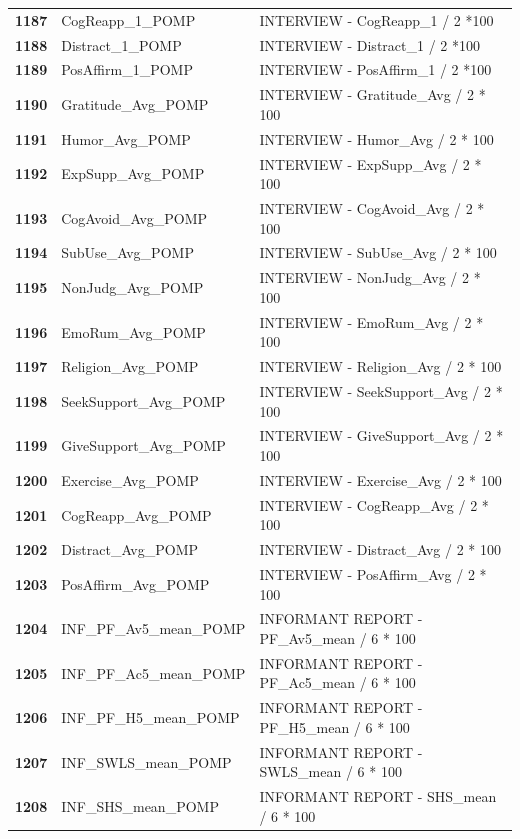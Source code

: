 \documentclass[
  letterpaper,
  DIV=11,
  numbers=noendperiod]{scrartcl}
\begin{document}
\begin{longtable}[t]{>{}cll}
\textbf{1187} & CogReapp\_1\_POMP & INTERVIEW - CogReapp\_1 / 2 *100\\
\textbf{1188} & Distract\_1\_POMP & INTERVIEW - Distract\_1 / 2 *100\\
\textbf{1189} & PosAffirm\_1\_POMP & INTERVIEW - PosAffirm\_1 / 2 *100\\
\textbf{1190} & Gratitude\_Avg\_POMP & INTERVIEW - Gratitude\_Avg / 2 * 100\\
\addlinespace
\textbf{1191} & Humor\_Avg\_POMP & INTERVIEW - Humor\_Avg / 2 * 100\\
\textbf{1192} & ExpSupp\_Avg\_POMP & INTERVIEW - ExpSupp\_Avg / 2 * 100\\
\textbf{1193} & CogAvoid\_Avg\_POMP & INTERVIEW - CogAvoid\_Avg / 2 * 100\\
\textbf{1194} & SubUse\_Avg\_POMP & INTERVIEW - SubUse\_Avg / 2 * 100\\
\textbf{1195} & NonJudg\_Avg\_POMP & INTERVIEW - NonJudg\_Avg / 2 * 100\\
\addlinespace
\textbf{1196} & EmoRum\_Avg\_POMP & INTERVIEW - EmoRum\_Avg / 2 * 100\\
\textbf{1197} & Religion\_Avg\_POMP & INTERVIEW - Religion\_Avg / 2 * 100\\
\textbf{1198} & SeekSupport\_Avg\_POMP & INTERVIEW - SeekSupport\_Avg / 2 * 100\\
\textbf{1199} & GiveSupport\_Avg\_POMP & INTERVIEW - GiveSupport\_Avg / 2 * 100\\
\textbf{1200} & Exercise\_Avg\_POMP & INTERVIEW - Exercise\_Avg / 2 * 100\\
\addlinespace
\textbf{1201} & CogReapp\_Avg\_POMP & INTERVIEW - CogReapp\_Avg / 2 * 100\\
\textbf{1202} & Distract\_Avg\_POMP & INTERVIEW - Distract\_Avg / 2 * 100\\
\textbf{1203} & PosAffirm\_Avg\_POMP & INTERVIEW - PosAffirm\_Avg / 2 * 100\\
\textbf{1204} & INF\_PF\_Av5\_mean\_POMP & INFORMANT REPORT - PF\_Av5\_mean / 6 * 100\\
\textbf{1205} & INF\_PF\_Ac5\_mean\_POMP & INFORMANT REPORT - PF\_Ac5\_mean / 6 * 100\\
\addlinespace
\textbf{1206} & INF\_PF\_H5\_mean\_POMP & INFORMANT REPORT - PF\_H5\_mean / 6 * 100\\
\textbf{1207} & INF\_SWLS\_mean\_POMP & INFORMANT REPORT - SWLS\_mean / 6 * 100\\
\textbf{1208} & INF\_SHS\_mean\_POMP & INFORMANT REPORT - SHS\_mean / 6 * 100\\

\end{longtable}
\end{document}
